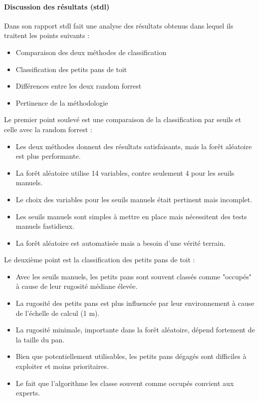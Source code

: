 \paragraph{Discussion des résultats (\acrshort{stdl})}
\par{Dans son rapport \acrshort{stdl} fait une analyse des résultats obtenus dans lequel ils traitent les points suivants :}
\begin{itemize}
    \item Comparaison des deux méthodes de classification
    \item Classification des petits pans de toit
    \item Différences entre les deux random forrest
    \item Pertinence de la méthodologie
\end{itemize}
\par{Le premier point soulevé est une comparaison de la classification par seuils et celle avec la random forrest :}
\begin{itemize}
    \item Les deux méthodes donnent des résultats satisfaisants, mais la forêt aléatoire est plus performante.
    \item La forêt aléatoire utilise 14 variables, contre seulement 4 pour les seuils manuels.
    \item Le choix des variables pour les seuils manuels était pertinent mais incomplet.
    \item Les seuils manuels sont simples à mettre en place mais nécessitent des tests manuels fastidieux.
    \item La forêt aléatoire est automatisée mais a besoin d'une vérité terrain.
\end{itemize}
\par{Le deuxième point est la classification des petits pans de toit :}
\begin{itemize}
    \item Avec les seuils manuels, les petits pans sont souvent classés comme "occupés" à cause de leur rugosité médiane élevée.
    \item La rugosité des petits pans est plus influencée par leur environnement à cause de l'échelle de calcul (1 m).
    \item La rugosité minimale, importante dans la forêt aléatoire, dépend fortement de la taille du pan.
    \item Bien que potentiellement utilisables, les petits pans dégagés sont difficiles à exploiter et moins prioritaires.
    \item Le fait que l'algorithme les classe souvent comme occupés convient aux experts.
\end{itemize}

